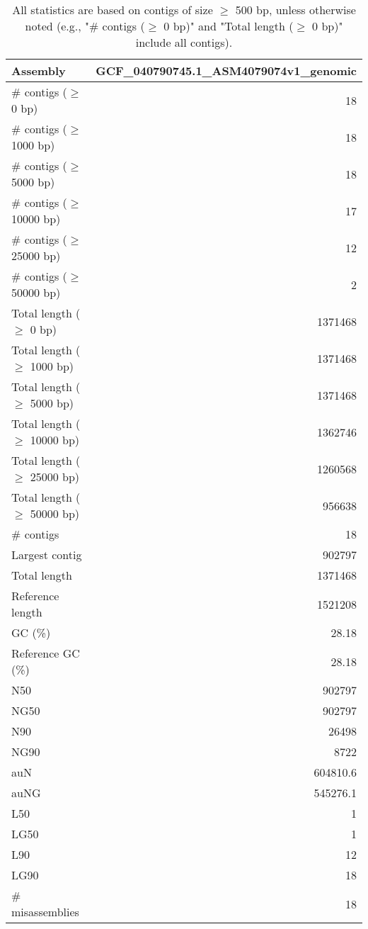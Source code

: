 \documentclass[12pt,a4paper]{article}
\begin{document}
\begin{table}[ht]
\begin{center}
\caption{All statistics are based on contigs of size $\geq$ 500 bp, unless otherwise noted (e.g., "\# contigs ($\geq$ 0 bp)" and "Total length ($\geq$ 0 bp)" include all contigs).}
\begin{tabular}{|l*{1}{|r}|}
\hline
Assembly & GCF\_040790745.1\_ASM4079074v1\_genomic \\ \hline
\# contigs ($\geq$ 0 bp) & 18 \\ \hline
\# contigs ($\geq$ 1000 bp) & 18 \\ \hline
\# contigs ($\geq$ 5000 bp) & 18 \\ \hline
\# contigs ($\geq$ 10000 bp) & 17 \\ \hline
\# contigs ($\geq$ 25000 bp) & 12 \\ \hline
\# contigs ($\geq$ 50000 bp) & 2 \\ \hline
Total length ($\geq$ 0 bp) & 1371468 \\ \hline
Total length ($\geq$ 1000 bp) & 1371468 \\ \hline
Total length ($\geq$ 5000 bp) & 1371468 \\ \hline
Total length ($\geq$ 10000 bp) & 1362746 \\ \hline
Total length ($\geq$ 25000 bp) & 1260568 \\ \hline
Total length ($\geq$ 50000 bp) & 956638 \\ \hline
\# contigs & 18 \\ \hline
Largest contig & 902797 \\ \hline
Total length & 1371468 \\ \hline
Reference length & 1521208 \\ \hline
GC (\%) & 28.18 \\ \hline
Reference GC (\%) & 28.18 \\ \hline
N50 & 902797 \\ \hline
NG50 & 902797 \\ \hline
N90 & 26498 \\ \hline
NG90 & 8722 \\ \hline
auN & 604810.6 \\ \hline
auNG & 545276.1 \\ \hline
L50 & 1 \\ \hline
LG50 & 1 \\ \hline
L90 & 12 \\ \hline
LG90 & 18 \\ \hline
\# misassemblies & 18 \\ \hline

\end{tabular}
\end{center}
\end{table}
\end{document}
